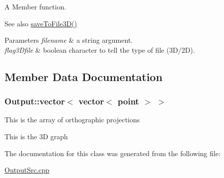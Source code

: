 A Member function. 

\begin{DoxySeeAlso}{See also}
\hyperlink{classOutput_aa16a2893d743f7c218c026efa3e65718}{save\+To\+File3\+D()} 
\end{DoxySeeAlso}

\begin{DoxyParams}{Parameters}
{\em filename} & a string argument. \\
\hline
{\em flag3\+Dfile} & boolean character to tell the type of file (3\+D/2D). \\
\hline
\end{DoxyParams}


\subsection{Member Data Documentation}
\subsubsection[{\texorpdfstring{vector$<$ vector$<$ point $>$ $>$}{vector< vector< point > >}}]{\setlength{\rightskip}{0pt plus 5cm}Output\+::vector$<$ vector$<$ {\bf point} $>$ $>$}\hypertarget{classOutput_a108ca6c08cfc8a442fac5f1dc864a481}{}\label{classOutput_a108ca6c08cfc8a442fac5f1dc864a481}
This is the array of orthographic projections

This is the 3D graph 

The documentation for this class was generated from the following file\+:\begin{DoxyCompactItemize}
\item 
\hyperlink{OutputSrc_8cpp}{Output\+Src.\+cpp}\end{DoxyCompactItemize}
